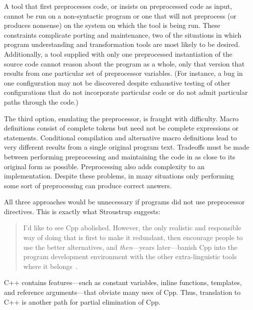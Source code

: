 A tool that first preprocesses code, or insists on preprocessed code as
input, cannot be run on a non-syntactic program or one that will not
preprocess (or produces nonsense) on the system on which the tool is being
run.  These constraints complicate porting and maintenance, two of the
situations in which program understanding and transformation tools are most
likely to be desired.  Additionally, a tool supplied with only one preprocessed
instantiation of the source code cannot reason about the program as a
whole, only that version that results from one particular set of
preprocessor variables.  (For instance, a bug in one configuration may not
be discovered despite exhaustive testing of other configurations that do
not incorporate particular code or do not admit particular paths through
the code.)

The third option, emulating the preprocessor, is fraught with difficulty.
Macro definitions consist of complete tokens but need not be complete
expressions or statements.  Conditional compilation and alternative macro
definitions lead to very different results from a single original program
text.  Tradeoffs must be made between performing preprocessing and
maintaining the code in as close to its original form as possible.
Preprocessing also adds complexity to an implementation.  Despite these
problems, in many
situations only performing some sort of preprocessing can produce correct
answers.

All three approaches would be unnecessary if programs did not use
preprocessor directives.  This is exactly what Stroustrup suggests:
\begin{quote}
  I'd like to see Cpp abolished.  However, the only realistic and
  responsible way of doing that is first to make it redundant, then
  encourage people to use the better alternatives, and {\em then\/}---years
  later---banish Cpp into the program development environment with the
  other extra-linguistic tools where it
  belongs~\cite[p.~426]{Stroustrup-DesignEvolution}.
\end{quote}
C++ contains features---such as constant variables, inline functions,
templates, and reference arguments---that obviate many uses of Cpp.  Thus,
translation to C++
is another path for partial elimination of Cpp.  


